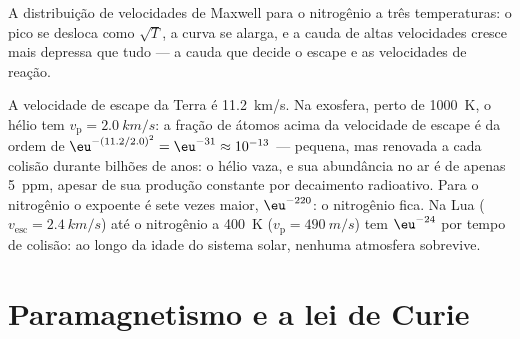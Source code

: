 \begin{omfigure}

{\small A distribuição de velocidades de Maxwell para o nitrogênio a três
temperaturas: o pico se desloca como $\sqrt T$, a curva se alarga, e a
cauda de altas velocidades cresce mais depressa que tudo --- a cauda que decide o escape
e as velocidades de reação.}
\end{omfigure}

\begin{example}\label{ex:b2:boltzmann-factor:escape}
A velocidade de escape da Terra é \qty{11.2}{km/s}. Na exosfera, perto de
\qty{1000}{K}, o hélio tem $v_{\text{p}} = \qty{2.0}{km/s}$: a fração de
átomos acima da velocidade de escape é da ordem de $\eu^{-(11.2/2.0)^2} = \eu^{-31}
\approx 10^{-13}$ --- pequena, mas renovada a cada colisão durante bilhões
de anos: o hélio vaza, e sua abundância no ar é de apenas
\qty{5}{ppm}, apesar de sua produção constante por decaimento radioativo. Para o
nitrogênio o expoente é sete vezes maior, $\eu^{-220}$: o nitrogênio fica.
Na Lua ($v_{\text{esc}} = \qty{2.4}{km/s}$) até o nitrogênio a
\qty{400}{K} ($v_{\text{p}} = \qty{490}{m/s}$) tem $\eu^{-24}$ por tempo de colisão:
ao longo da idade do sistema solar, nenhuma atmosfera sobrevive.
\end{example}

\section{Paramagnetismo e a lei de Curie}


